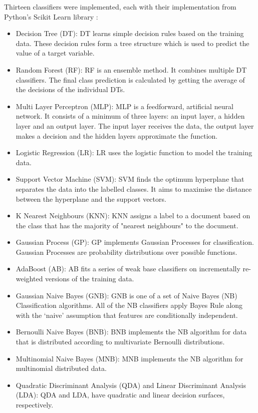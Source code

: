 Thirteen classifiers were implemented, each with their implementation from Python's Scikit Learn library \cite{scikit-learn}:
\begin{itemize}
    \item Decision Tree (DT): DT learns simple decision rules based on the training data. These decision rules form a tree structure which is used to predict the value of a target variable.
    \item Random Forest (RF): RF is an ensemble method. It combines multiple DT classifiers. The final class prediction is calculated by getting the average of the decisions of the individual DTs.
    \item Multi Layer Perceptron (MLP): MLP is a feedforward, artificial neural network. It consists of a minimum of three layers: an input layer, a hidden layer and an output layer. The input layer receives the data, the output layer makes a decision and the hidden layers approximate the function.
    \item Logistic Regression (LR): LR uses the logistic function to model the training data. 
    \item Support Vector Machine (SVM): SVM finds the optimum hyperplane that separates the data into the labelled classes. It aims to maximise the distance between the hyperplane and the support vectors.
    \item K Nearest Neighbours (KNN): KNN assigns a label to a document based on the class that has the majority of "nearest neighbours" to the document.
    \item Gaussian Process (GP): GP implements Gaussian Processes for classification. Gaussian Processes are probability distributions over possible functions.
    \item AdaBoost (AB): AB fits a series of weak base classifiers on incrementally re-weighted versions of the training data.
    \item Gaussian Naive Bayes (GNB): GNB is one of a set of Naive Bayes (NB) Classification algorithms. All of the NB classifiers apply Bayes Rule along with the ‘naive’ assumption that features are conditionally independent.
    \item Bernoulli Naive Bayes (BNB): BNB implements the NB algorithm for data that is distributed according to multivariate Bernoulli distributions.
    \item Multinomial Naive Bayes (MNB): MNB implements the NB algorithm for multinomial distributed data.
    \item Quadratic Discriminant Analysis (QDA) and Linear Discriminant Analysis (LDA): QDA and LDA, have quadratic and linear decision surfaces, respectively.
\end{itemize}

